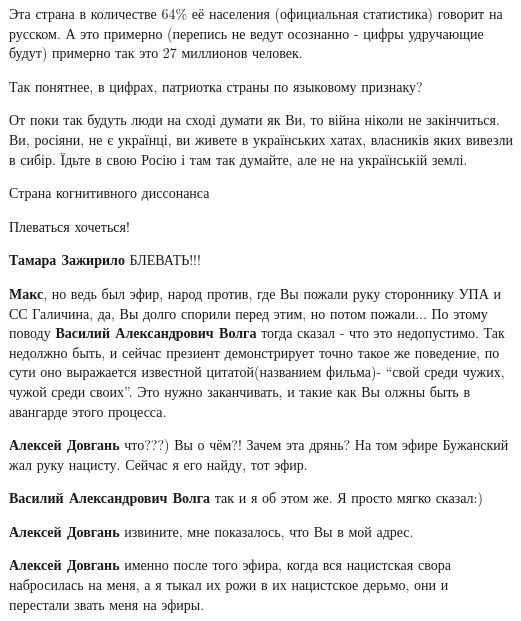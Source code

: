 \begin{itemize}
\begin{itemize}
\begin{itemize}
Эта страна в количестве 64\% её населения (официальная статистика) говорит на
русском. А это примерно (перепись не ведут осознанно - цифры удручающие будут)
примерно так это 27 миллионов человек.

Так понятнее, в цифрах, патриотка страны по языковому признаку?


От поки так будуть люди на сході думати як Ви, то війна ніколи не закінчиться.
Ви, росіяни, не є українці, ви живете в українських хатах, власників яких
вивезли в сибір. Їдьте в свою Росію і там так думайте, але не на українській
землі.

\end{itemize}

Страна когнитивного диссонанса

Плеваться хочеться!

\textbf{Тамара Зажирило}
БЛЕВАТЬ!!!


\textbf{Макс}, но ведь был эфир, народ против, где Вы пожали руку стороннику УПА и СС
Галичина, да, Вы долго спорили перед этим, но потом пожали... По этому поводу
\textbf{Василий Александрович Волга} тогда сказал - что это недопустимо. Так недолжно
быть, и сейчас презиент демонстрирует точно такое же поведение, по сути оно
выражается известной цитатой(названием фильма)- \enquote{свой среди чужих, чужой среди
своих}. Это нужно заканчивать, и такие как Вы олжны быть в авангарде этого
процесса.

\begin{itemize}
\textbf{Алексей Довгань} что???) Вы о чём?! Зачем эта дрянь? На том эфире Бужанский жал руку нацисту. Сейчас я его найду, тот эфир.

\textbf{Василий Александрович Волга} так и я об этом же. Я просто мягко сказал:)

\textbf{Алексей Довгань} извините, мне показалось, что Вы в мой адрес.

\textbf{Алексей Довгань} именно после того эфира, когда вся нацистская свора
набросилась на меня, а я тыкал их рожи в их нацистское дерьмо, они и перестали
звать меня на эфиры.
\end{itemize}



\end{itemize}
\end{itemize}
